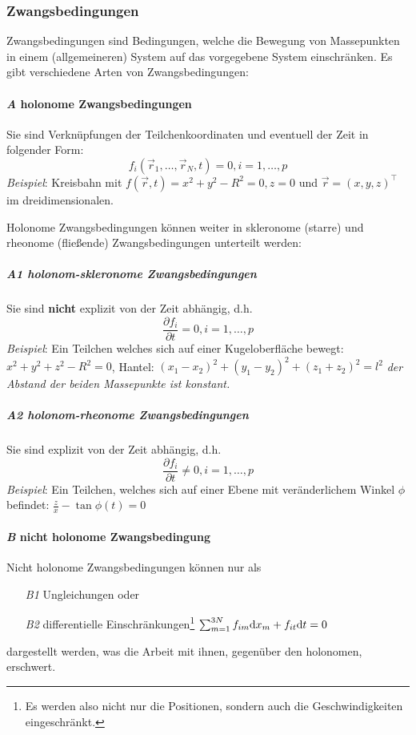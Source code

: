 \subsubsection{Zwangsbedingungen} 
Zwangsbedingungen sind Bedingungen, welche die Bewegung von Massepunkten in einem (allgemeineren) System auf das vorgegebene System einschränken. Es gibt verschiedene Arten von Zwangsbedingungen:

\paragraph{\textit{A} holonome Zwangsbedingungen} Sie sind Verknüpfungen der Teilchenkoordinaten und eventuell der
Zeit in folgender Form: $$f_i(\vec{r}_1, \dots, \vec{r}_N, t) = 0, i = 1, \dots, p$$ 
\emph{Beispiel}: Kreisbahn mit $f(\vec{r}, t) = x^2 + y^2 - R^2 = 0, z = 0$ und $\vec{r} = (x,y,z)^\top$ im dreidimensionalen.

Holonome Zwangsbedingungen können weiter in skleronome (starre) und rheonome (fließende) Zwangsbedingungen unterteilt werden:

\subparagraph{\textit{A1} holonom-skleronome Zwangsbedingungen} Sie sind \textbf{nicht} explizit von der Zeit abhängig, d.h.
$$ \frac{\partial f_i}{\partial t} = 0, i = 1, \dots, p$$
\emph{Beispiel}: Ein Teilchen welches sich auf einer Kugeloberfläche bewegt: $x^2 + y^2 + z^2 - R^2 = 0$, Hantel: $(x_1 - x_2)^2 + (y_1 - y_2)^2 + (z_1 + z_2)^2 = l^2$ \textit{der Abstand der beiden Massepunkte ist konstant.}

\subparagraph{\textit{A2} holonom-rheonome Zwangsbedingungen} Sie sind explizit von der Zeit abhängig, d.h.
$$ \frac{\partial f_i}{\partial t} \neq 0, i = 1, \dots, p$$
\emph{Beispiel}: Ein Teilchen, welches sich auf einer Ebene mit veränderlichem Winkel $\phi$ befindet: $\frac{z}{x} - \tan{\phi(t)} = 0$


\paragraph{\textit{B} nicht holonome Zwangsbedingung}
Nicht holonome Zwangsbedingungen können nur als 
\begin{itemize}
	\item[\textit{B1}] Ungleichungen oder
	\item[\textit{B2}] differentielle Einschränkungen\footnote{Es werden also nicht nur die Positionen, sondern auch die Geschwindigkeiten eingeschränkt.}
	$ \sum_{m = 1}^{3N} f_{im} \mathrm d x_m + f_{it} \mathrm d t = 0$
\end{itemize}
dargestellt werden, was die Arbeit mit ihnen, gegenüber den holonomen, erschwert. 


